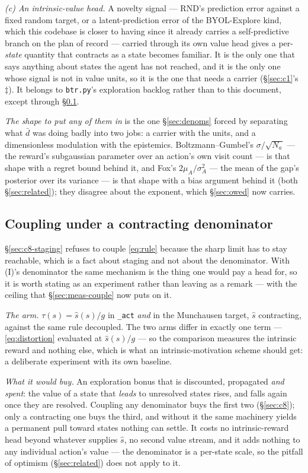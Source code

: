 \documentclass{article}
\newcommand{\dbar}{\bar{d}}
\begin{document}
\emph{(c) An intrinsic-value head.} A novelty signal --- RND's prediction error against a fixed
random target, or a latent-prediction error of the BYOL-Explore kind, which this codebase is
closer to having since it already carries a self-predictive branch on the plan of record ---
carried through its own value head gives a per-\emph{state} quantity that contracts as a state
becomes familiar. It is the only one that says anything about states the agent has not reached,
and it is the only one whose signal is not in value units, so it is the one that needs a carrier
(\S\ref{sec:c1}'s $\ddagger$). It belongs to \texttt{btr.py}'s exploration backlog rather than to
this document, except through \S\ref{sec:coupling}.

\emph{The shape to put any of them in} is the one \S\ref{sec:denoms} forced by separating what
$\dbar$ was doing badly into two jobs: a carrier with the units, and a dimensionless modulation
with the epistemics. Boltzmann--Gumbel's $\sigma/\sqrt{N_a}$ --- the reward's subgaussian
parameter over an action's own visit count --- is that shape with a regret bound behind it, and
Fox's $2\mu_A/\sigma_A^2$ --- the mean of the gap's posterior over its variance --- is that shape
with a bias argument behind it (both \S\ref{sec:related}); they disagree about the exponent,
which \S\ref{sec:owed} now carries.

\subsection{Coupling under a contracting denominator}
\label{sec:coupling}

\S\ref{sec:c8-staging} refuses to couple \eqref{eq:rule} because the sharp limit has to stay
reachable, which is a fact about staging and not about the denominator. With (I)'s denominator
the same mechanism is the thing one would pay a head for, so it is worth stating as an experiment
rather than leaving as a remark --- with the ceiling that \S\ref{sec:meas-couple} now puts on it.

\emph{The arm.} $\tau(s) = \hat{s}(s)/g$ in \texttt{\_act} \emph{and} in the Munchausen target,
$\hat{s}$ contracting, against the same rule decoupled. The two arms differ in exactly one term
--- \eqref{eq:distortion} evaluated at $\hat{s}(s)/g$ --- so the comparison measures the intrinsic
reward and nothing else, which is what an intrinsic-motivation scheme should get: a deliberate
experiment with its own baseline.

\emph{What it would buy.} An exploration bonus that is discounted, propagated \emph{and spent}:
the value of a state that \emph{leads} to unresolved states rises, and falls again once they are
resolved. Coupling any denominator buys the first two (\S\ref{sec:c8}); only a contracting one
buys the third, and without it the same machinery yields a permanent pull toward states nothing
can settle. It costs
no intrinsic-reward head beyond whatever supplies $\hat{s}$, no second value stream, and it adds
nothing to any individual action's value --- the denominator is a per-state scale, so the pitfall
of optimism (\S\ref{sec:related}) does not apply to it.
\end{document}
